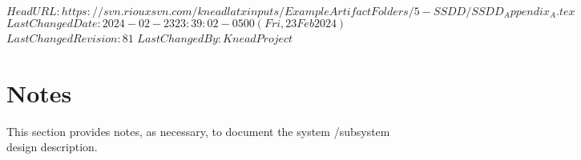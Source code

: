 \svnidlong
{$HeadURL: https://svn.riouxsvn.com/kneadlatxinputs/ExampleArtifactFolders/5-SSDD/SSDD_Appendix_A.tex $}
{$LastChangedDate: 2024-02-23 23:39:02 -0500 (Fri, 23 Feb 2024) $}
{$LastChangedRevision: 81 $}
{$LastChangedBy: KneadProject $}

\chapter{Notes}
\label{loc:Notes}


This section provides notes, as necessary, to document the system /subsystem design description.